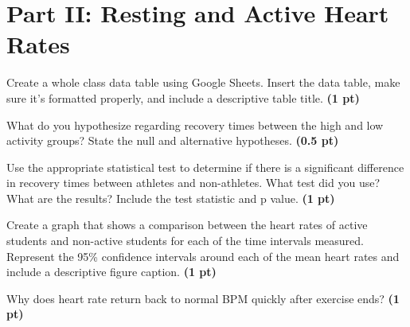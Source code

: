 \documentclass[12pt,a4paper]{article}
\begin{document}
\section*{Part II: Resting and Active Heart Rates}
\begin{enumerate}[font=\bfseries, wide, resume]
    {\color{under}\item Create a whole class data table using Google Sheets. Insert the data table, make sure it’s formatted properly, and include a descriptive table title. \textbf{(1 pt)}}
    
    
    {\color{under}\item What do you hypothesize regarding recovery times between the high and low activity groups?  State the null and alternative hypotheses. \textbf{(0.5 pt)}}
    
    
    {\color{under}\item  Use the appropriate statistical test to determine if there is a significant difference in recovery times between athletes and non-athletes.  What test did you use?  What are the results?  Include the test statistic and p value. \textbf{(1 pt)}}
    
    {\color{under}\item Create a graph that shows a comparison between the heart rates of active students and non-active students for each of the time intervals measured.  Represent the 95\% confidence intervals around each of the mean heart rates and include a descriptive figure caption. \textbf{(1 pt)}}

    {\color{under}\item Why does heart rate return back to normal BPM quickly after exercise ends? \textbf{(1 pt)}}
\end{enumerate}
    
\end{document}
